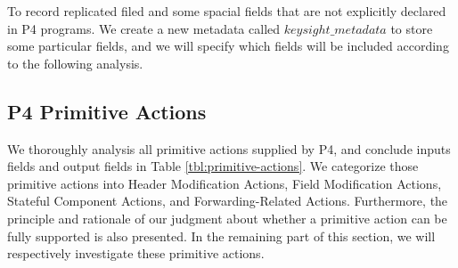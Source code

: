 \documentclass[sigconf, 10pt]{acmart}
\theoremstyle{plain}
\begin{document}
To record replicated filed and some spacial fields that are not explicitly declared in P4 programs. We create a new metadata called $keysight\_metadata$ to store some particular fields, and we will specify which fields will be included according to the following analysis.


\subsection{P4 Primitive Actions}
We thoroughly analysis all primitive actions supplied by P4, and conclude inputs fields and output fields in Table \ref{tbl:primitive-actions}. We categorize those primitive actions into Header Modification Actions, Field Modification Actions, Stateful Component Actions, and Forwarding-Related Actions. Furthermore, the principle and rationale of our judgment about whether a primitive action can be fully supported is also presented. In the remaining part of this section, we will respectively investigate these primitive actions. 
\end{document}
